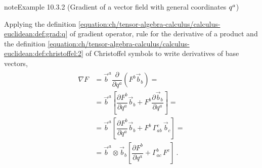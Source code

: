 \documentclass[letterpaper,10pt,english]{jupyterBook}
\begin{document}
\begin{sphinxadmonition}{note}{Example 10.3.2 (Gradient of a vector field \sphinxhyphen{} with general coordinates \protect\(q^{a}\protect\))}



\sphinxAtStartPar
Applying the definition \eqref{equation:ch/tensor-algebra-calculus/calculus-euclidean:def:grad:q} of gradient operator, rule for the derivative of a product and the definition \eqref{equation:ch/tensor-algebra-calculus/calculus-euclidean:def:christoffel:2} of Christoffel symbols to write derivatives of base vectors,
\begin{equation*}
\begin{split}\begin{aligned}
  \nabla F 
  & = \vec{b}^a \dfrac{\partial}{\partial q^a} \left( F^b \vec{b}_b \right) = \\
  & = \vec{b}^a \left[ \dfrac{\partial F^b}{\partial q^a} \vec{b}_b + F^b \dfrac{\partial \vec{b}_b}{\partial q^a} \right] = \\
  & = \vec{b}^a \left[ \dfrac{\partial F^b}{\partial q^a} \vec{b}_b + F^b \, \Gamma_{ab}^c \, \vec{b}_c \right] = \\
  & = \vec{b}^a \otimes \vec{b}_b \left[ \dfrac{\partial F^b}{\partial q^a} + \Gamma_{ac}^b \, F^c \right] \ .
\end{aligned}\end{split}
\end{equation*}\end{sphinxadmonition}
\label{ch/tensor-algebra-calculus/calculus-euclidean:example-6}
\end{document}
